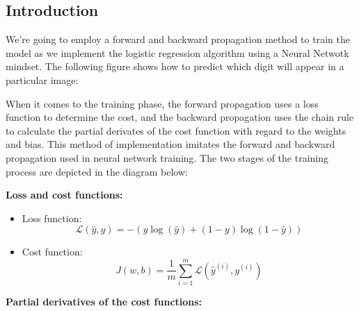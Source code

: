 \documentclass[11pt]{article}
\begin{document}
    \hypertarget{introduction}{%
\subsection{Introduction}\label{introduction}}

We're going to employ a forward and backward propagation method to train
the model as we implement the logistic regression algorithm using a
Neural Netwotk mindset. The following figure shows how to predict which
digit will appear in a particular image:

    When it comes to the training phase, the forward propagation uses a loss
function to determine the cost, and the backward propagation uses the
chain rule to calculate the partial derivates of the cost function with
regard to the weights and bias. This method of implementation imitates
the forward and backward propagation used in neural network training.
The two stages of the training process are depicted in the diagram
below:
\begin{center}
\end{center}
    \textbf{Loss and cost functions:}
    
    \begin{itemize}
    \item Loss function:
\[ \mathcal{L}(\hat{y},y)=-\left( y\log(\hat{y})+(1-y)\log(1-\hat{y}) \right)\]
    \item Cost function:
\[ J(w,b) = \frac{1}{m}\sum\limits_{i=1}^m\mathcal{L}(\hat{y}^{(i)},y^{(i)})\]

    \end{itemize}
    \textbf{Partial derivatives of the cost functions:}
\end{document}
